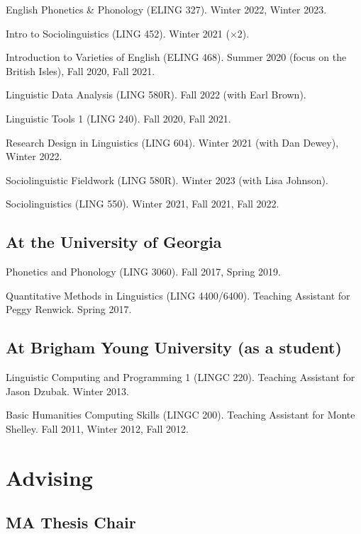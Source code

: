 \documentclass[
]{article}
\begin{document}
English Phonetics \& Phonology (ELING 327). Winter 2022, Winter 2023.

Intro to Sociolinguistics (LING 452). Winter 2021 (×2).

Introduction to Varieties of English (ELING 468). Summer 2020 (focus on
the British Isles), Fall 2020, Fall 2021.

Linguistic Data Analysis (LING 580R). Fall 2022 (with Earl Brown).

Linguistic Tools 1 (LING 240). Fall 2020, Fall 2021.

Research Design in Linguistics (LING 604). Winter 2021 (with Dan Dewey),
Winter 2022.

Sociolinguistic Fieldwork (LING 580R). Winter 2023 (with Lisa Johnson).

Sociolinguistics (LING 550). Winter 2021, Fall 2021, Fall 2022.

\hypertarget{at-the-university-of-georgia}{%
\subsection{At the University of
Georgia}\label{at-the-university-of-georgia}}

Phonetics and Phonology (LING 3060). Fall 2017, Spring 2019.

Quantitative Methods in Linguistics (LING 4400/6400). Teaching Assistant
for Peggy Renwick. Spring 2017.

\hypertarget{at-brigham-young-university-as-a-student}{%
\subsection{At Brigham Young University (as a
student)}\label{at-brigham-young-university-as-a-student}}

Linguistic Computing and Programming 1 (LINGC 220). Teaching Assistant
for Jason Dzubak. Winter 2013.

Basic Humanities Computing Skills (LINGC 200). Teaching Assistant for
Monte Shelley. Fall 2011, Winter 2012, Fall 2012.

\hypertarget{advising}{%
\section{Advising}\label{advising}}

\hypertarget{ma-thesis-chair}{%
\subsection{MA Thesis Chair}\label{ma-thesis-chair}}
\end{document}
